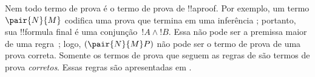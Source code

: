\documentclass[../../../include/open-logic-section]{subfiles}
\begin{document}
Nem todo termo de prova é o termo de prova de !!a{proof}. Por exemplo,
um termo $\pair{N}{M}$ codifica uma prova que termina em uma inferência
\Intro{\land}; portanto, sua !!{formula} final é uma conjunção~$!A \land
!B$. Essa não pode ser a premissa maior de uma regra~\Elim{\lif}; logo,
$(\pair{N}{M}P)$ não pode ser o termo de prova de uma prova correta.
Somente os termos de prova que seguem as regras de  são
termos de prova \emph{corretos}. Essas regras são apresentadas em
.


\end{document}
